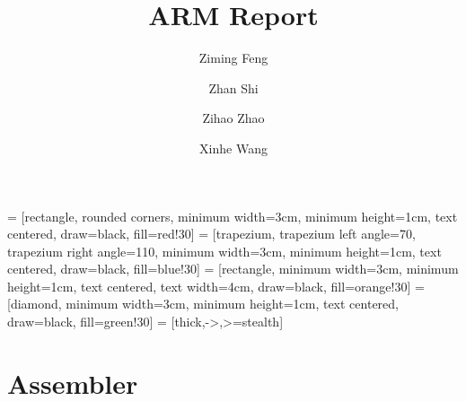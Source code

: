 \documentclass[9pt,a4paper]{article}
\begin{document}
\title{ARM Report}
\author{Ziming Feng}
\author{Zhan Shi}
\author{Zihao Zhao}
\author{Xinhe Wang}

\date{}

\maketitle
\vspace{-2em}

\usetikzlibrary{shapes.geometric, arrows}
 = [rectangle, rounded corners, minimum width=3cm, minimum height=1cm, text centered, draw=black, fill=red!30]
 = [trapezium, trapezium left angle=70, trapezium right angle=110, minimum width=3cm, minimum height=1cm, text centered, draw=black, fill=blue!30]
 = [rectangle, minimum width=3cm, minimum height=1cm, text centered, text width=4cm, draw=black, fill=orange!30]
 = [diamond, minimum width=3cm, minimum height=1cm, text centered, draw=black, fill=green!30]
 = [thick,->,>=stealth]

\section{Assembler}
\end{document}
